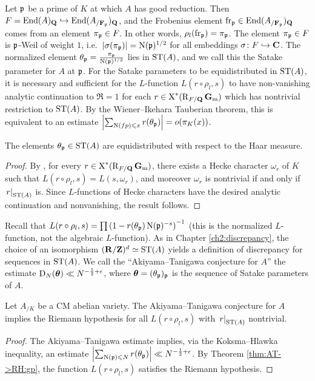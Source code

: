 Let $\mathfrak{p}$ be a prime of $K$ at which $A$ has good reduction. Then 
$F = \operatorname{End}(A)_{\mathbf{Q}}\hookrightarrow \operatorname{End}(A_{/\mathbf{F}_{\mathfrak{p}}})_{\mathbf{Q}}$, and the Frobenius 
element $\mathrm{fr}_{\mathfrak{p}}\in \operatorname{End}(A_{/\mathbf{F}_{\mathfrak{p}}})_{\mathbf{Q}}$ comes from an element 
$\pi_{\mathfrak{p}}\in F$. In other words, $\rho_l(\mathrm{fr}_{\mathfrak{p}}) = \pi_{\mathfrak{p}}$. The element 
$\pi_{\mathfrak{p}}\in F$ is $\mathfrak{p}$-Weil of weight $1$, 
i.e.~$|\sigma(\pi_{\mathfrak{p}})| = \operatorname{N}(\mathfrak{p})^{1/2}$ for all embeddings 
$\sigma\colon F\hookrightarrow \mathbf{C}$. The normalized element 
$\theta_{\mathfrak{p}} = \frac{\pi_{\mathfrak{p}}}{\operatorname{N}(\mathfrak{p})^{1/2}}$ lies in $\mathrm{ST}(A)$, and we call this 
the Satake parameter for $A$ at $\mathfrak{p}$. For the Satake parameters to be 
equidistributed in $\mathrm{ST}(A)$, it is necessary and sufficient for the 
$L$-function $L(r\circ \rho_l,s)$ to have non-vanishing analytic continuation 
to $\Re =1$ for each $r\in \operatorname{X}^\ast(\operatorname{R}_{F/\mathbf{Q}}\mathbf{G}_\mathrm{m})$ which has nontrivial 
restriction to $\mathrm{ST}(A)$. By the Wiener--Ikehara Tauberian theorem, this is 
equivalent to an estimate 
$\left| \sum_{\operatorname{N}(fp)\leqslant x} r(\theta_{\mathfrak{p}})\right| = o(\pi_K(x))$. 

\begin{theorem}
The elements $\theta_{\mathfrak{p}}\in \mathrm{ST}(A)$ are equidistributed with respect to the 
Haar measure. 
\end{theorem}
\begin{proof}
By \cite[Th.~10, 11]{serre-tate-1968}, for every 
$r\in \operatorname{X}^\ast(\operatorname{R}_{F/\mathbf{Q}}\mathbf{G}_\mathrm{m})$, there exists a Hecke character $\omega_r$ of $K$ 
such that $L(r\circ \rho_l,s) = L(s,\omega_r)$, and moreover $\omega_r$ is 
nontrivial if and only if $\left.r\right|_{\mathrm{ST}(A)}$ is. Since $L$-functions of 
Hecke characters have the desired analytic continuation and nonvanishing, the 
result follows. 
\end{proof}

Recall that 
$L(r\circ \rho_l,s) = \prod \left(1 - r(\theta_{\mathfrak{p}}) \operatorname{N}(\mathfrak{p})^{-s}\right)^{-1}$ 
(this is the normalized $L$-function, not the algebraic $L$-function). 
As in Chapter \ref{ch2:discrepancy}, the choice of an isomorphism
$(\mathbf{R}/\mathbf{Z})^d\simeq \mathrm{ST}(A)$ yields a definition of discrepancy 
for sequences in $\mathrm{ST}(A)$. We call the ``Akiyama--Tanigawa conjecture for $A$'' 
the estimate $\operatorname{D}_N({\boldsymbol\theta}) \ll N^{-\frac 1 2+\epsilon}$, where 
${\boldsymbol\theta} = (\theta_{\mathfrak{p}})_{\mathfrak{p}}$ is the sequence of Satake parameters of $A$. 

\begin{theorem}\label{AT->RH:AB}
Let $A_{/K}$ be a CM abelian variety. The Akiyama--Tanigawa conjecture for $A$ 
implies the Riemann hypothesis for all $L(r\circ \rho_l,s)$ with 
$\left. r\right|_{\mathrm{ST}(A)}$ nontrivial. 
\end{theorem}
\begin{proof}
The Akiyama--Tanigawa estimate implies, via the Koksma--Hlawka inequality, an 
estimate 
$\left| \sum_{\operatorname{N}(\mathfrak{p})\leqslant N} r(\theta_{\mathfrak{p}})\right| \ll N^{-\frac 1 2+\epsilon}$. 
By Theorem \ref{thm:AT->RH:gp}, the function $L(r\circ \rho_l,s)$ satisfies 
the Riemann hypothesis. 
\end{proof}

